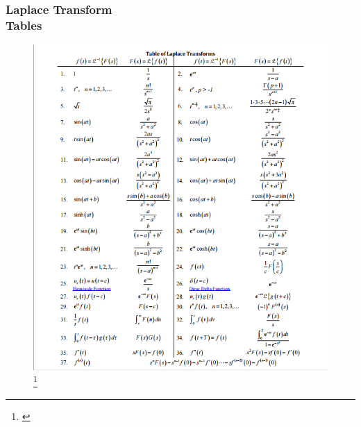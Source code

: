 \documentclass[hyperref={pdfpagelabels=true}]{beamer}
\begin{document}
\begin{frame}
\frametitle{Laplace Transform \\ {\large Tables}}
\begin{figure}[!tbp]
\centering
\includegraphics[scale = 0.3]{figs/Selection_015.png}
\footnote{\href{http://tutorial.math.lamar.edu/pdf/Laplace_Table.pdf}{}}
\end{figure}
\end{frame}
\end{document}
